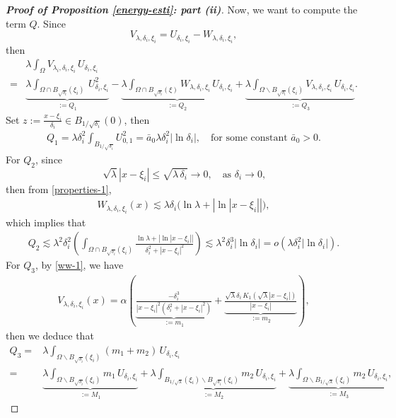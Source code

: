 \documentclass[a4paper,reqno,11pt,oneside]{amsart}
\numberwithin{equation}{section}
\begin{document}
\begin{proof}[\textbf{Proof of Proposition \eqref{energy-esti}: part (ii)}]
Now, we want to compute the term $Q$. Since
$$V_{\lambda,\delta_i,\xi_i}=U_{\delta_i,\xi_i}-W_{\lambda,\delta_i,\xi_i},$$
then
\begin{align}\label{main}
    &{\lambda}\displaystyle\int_{\Omega}V_{\lambda_i,\delta_i,\xi_i}\,U_{\delta_i,\xi_i}\nonumber\\=&\underbrace{{\lambda}\displaystyle\int_{\Omega\cap B_{\sqrt{\delta_i}}(\xi_i)}\,U^2_{\delta_i,\xi_i}}_{:=Q_1}-\underbrace{{\lambda}\displaystyle\int_{\Omega\cap B_{\sqrt{\delta_i}}(\xi)}W_{\lambda,\delta_i,\xi_i}\,U_{\delta_i,\xi_i}}_{:=Q_2}+\underbrace{{\lambda}\displaystyle\int_{\Omega\backslash B_{\sqrt{\delta_i}}(\xi_i)}V_{\lambda,\delta_i,\xi_i}\,U_{\delta_i,\xi_i}}_{:=Q_3}.
\end{align}
Set $z:=\frac{x-\xi_i}{\delta_i}\in B_{1/\sqrt{\delta_i}}(0)$, then
\begin{align}
    \label{q1}
    Q_{1}=\lambda\delta_i^2\displaystyle\int_{B_{1/\sqrt{\delta_i}}}U_{0,1}^2=\bar{a}_0\lambda\delta_i^2|\ln{\delta_i}|,\quad\text{for some constant $\bar{a}_0>0$.}
\end{align}
    For $Q_2$, since $$\sqrt{\lambda}|x-\xi_i|\leq \sqrt{\lambda\,\delta_i}\to 0,\quad\text{as $\delta_i\to 0$,}$$
then from \eqref{properties-1}, 
\begin{align*}
    W_{\lambda,\delta_i,\xi_i}(x)\lesssim\lambda\delta_i\big(\ln{\lambda}+|\ln{|x-\xi_i|}|\big),
\end{align*}
which implies that
\begin{align}\label{q-2}
Q_{2}\lesssim\lambda^2\delta_i^2\left(\displaystyle\int_{\Omega\cap B_{\sqrt{\delta_i}}(\xi_i)}\frac{\ln{\lambda}+|\ln{|x-\xi_i|}|}{\delta_i^2+|x-\xi_i|^2}\right)\lesssim\lambda^2\delta_i^3|\ln{\delta_i}|=o\left(\lambda\delta_i^2|\ln{\delta_i}|\right).
\end{align}
For $Q_3$, by \eqref{ww-1}, we have
\begin{align*}
    V_{\lambda,\delta_i,\xi_i}(x)
=\alpha\left(\underbrace{\frac{-\delta_i^3}{|x-\xi_i|^2\left(\delta_i^2+|x-\xi_i|^2\right)}}_{:=m_1}+\underbrace{\frac{\sqrt{\lambda}\delta_i\, K_{1}(\sqrt{\lambda}|x-\xi_i|)}{|x-\xi_i|}}_{:=m_2}\right),
\end{align*}
then  we deduce that
\begin{align*}
    Q_3=&{\lambda}\displaystyle\int_{\Omega\backslash B_{\sqrt{\delta_i}}(\xi_i)}\left(m_1+m_2\right)\,U_{\delta_i,\xi_i}\\=&\underbrace{{\lambda}\displaystyle\int_{\Omega\backslash B_{\sqrt{\delta_i}}(\xi_i)}m_1\,U_{\delta_i,\xi_i}}_{:=M_1}+\underbrace{{\lambda}\displaystyle\int_{B_{1/\sqrt{\lambda}}(\xi_i)\backslash B_{\sqrt{\delta_i}}(\xi_i)}m_2\,U_{\delta_i,\xi_i}}_{:=M_2}+\underbrace{{\lambda}\displaystyle\int_{\Omega\backslash B_{1/\sqrt{\lambda}}(\xi_i)}m_2\,U_{\delta_i,\xi_i}}_{:=M_3},

\end{align*}
\end{proof}
\end{document}

